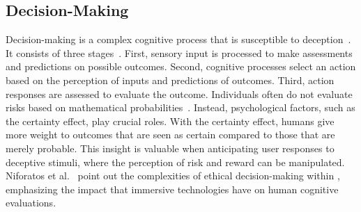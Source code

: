 






\subsection{Decision-Making}

Decision-making is a complex cognitive process that is susceptible to deception~\cite{dunbar:2014}. %
It consists of three stages~\cite{ernst2005neurobiology}. %
First, sensory input is processed to make assessments and predictions on possible outcomes.
Second, cognitive processes select an action based on the perception of inputs and predictions of outcomes.
Third, action responses are assessed to evaluate the outcome.
Individuals often do not evaluate risks based on mathematical probabilities~\cite{prospect-theory}. 
Instead, psychological factors, such as the certainty effect, play crucial roles. 
With the certainty effect, humans give more weight to outcomes that are seen as certain compared to those that are merely probable.
This insight is valuable when anticipating \MR user responses to deceptive stimuli, where the perception of risk and reward can be manipulated.
Niforatos et al.~\cite{niforatos} point out the complexities of ethical decision-making within \MR, emphasizing the impact that immersive technologies have on human cognitive evaluations.

